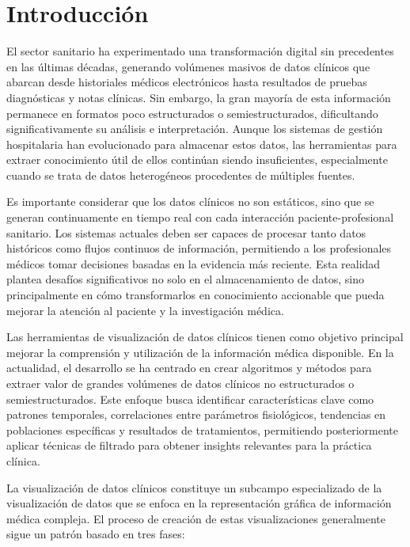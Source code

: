 \chapter{Introducción}

El sector sanitario ha experimentado una transformación digital sin precedentes en las últimas décadas, generando volúmenes masivos de datos clínicos que abarcan desde historiales médicos electrónicos hasta resultados de pruebas diagnósticas y notas clínicas. Sin embargo, la gran mayoría de esta información permanece en formatos poco estructurados o semiestructurados, dificultando significativamente su análisis e interpretación. Aunque los sistemas de gestión hospitalaria han evolucionado para almacenar estos datos, las herramientas para extraer conocimiento útil de ellos continúan siendo insuficientes, especialmente cuando se trata de datos heterogéneos procedentes de múltiples fuentes.

Es importante considerar que los datos clínicos no son estáticos, sino que se generan continuamente en tiempo real con cada interacción paciente-profesional sanitario. Los sistemas actuales deben ser capaces de procesar tanto datos históricos como flujos continuos de información, permitiendo a los profesionales médicos tomar decisiones basadas en la evidencia más reciente. Esta realidad plantea desafíos significativos no solo en el almacenamiento de datos, sino principalmente en cómo transformarlos en conocimiento accionable que pueda mejorar la atención al paciente y la investigación médica.

Las herramientas de visualización de datos clínicos tienen como objetivo principal mejorar la comprensión y utilización de la información médica disponible. En la actualidad, el desarrollo se ha centrado en crear algoritmos y métodos para extraer valor de grandes volúmenes de datos clínicos no estructurados o semiestructurados. Este enfoque busca identificar características clave como patrones temporales, correlaciones entre parámetros fisiológicos, tendencias en poblaciones específicas y resultados de tratamientos, permitiendo posteriormente aplicar técnicas de filtrado para obtener insights relevantes para la práctica clínica.

La visualización de datos clínicos constituye un subcampo especializado de la visualización de datos que se enfoca en la representación gráfica de información médica compleja. El proceso de creación de estas visualizaciones generalmente sigue un patrón basado en tres fases:

